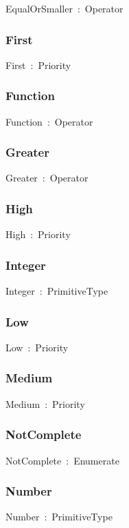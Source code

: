 \documentclass{article}
\begin{document}
EqualOrSmaller~:~Operator

\subsubsection*{First}

First~:~Priority

\subsubsection*{Function}

Function~:~Operator

\subsubsection*{Greater}

Greater~:~Operator

\subsubsection*{High}

High~:~Priority

\subsubsection*{Integer}

Integer~:~PrimitiveType

\subsubsection*{Low}

Low~:~Priority

\subsubsection*{Medium}

Medium~:~Priority

\subsubsection*{NotComplete}

NotComplete~:~Enumerate

\subsubsection*{Number}

Number~:~PrimitiveType
\end{document}
